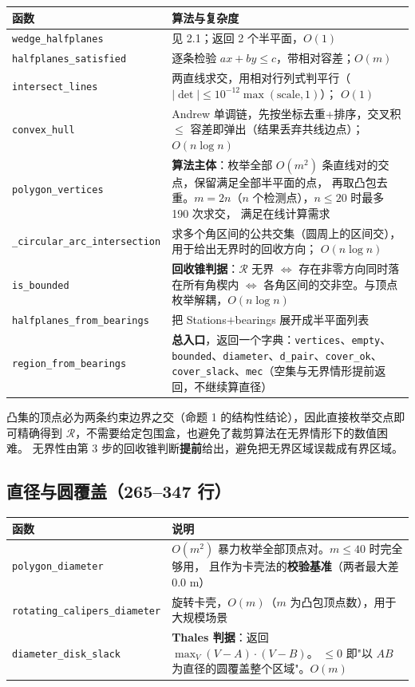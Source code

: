 \begin{longtable}{p{5.0cm}p{9.6cm}}
\toprule
函数 & 算法与复杂度 \\ \midrule
\endhead
\texttt{wedge\_halfplanes} & 见 2.1；返回 2 个半平面，$O(1)$ \\
\texttt{halfplanes\_satisfied} & 逐条检验 $ax+by\le c$，带相对容差；$O(m)$ \\
\texttt{intersect\_lines} & 两直线求交，用相对行列式判平行（$|\det|\le10^{-12}\max(\text{scale},1)$）；
$O(1)$ \\
\texttt{convex\_hull} & Andrew 单调链，先按坐标去重+排序，交叉积 $\le$ 容差即弹出（结果丢弃共线边点）；
$O(n\log n)$ \\
\texttt{polygon\_vertices} & \textbf{算法主体}：枚举全部 $O(m^2)$ 条直线对的交点，保留满足全部半平面的点，
再取凸包去重。$m=2n$（$n$ 个检测点），$n\le20$ 时最多 190 次求交，
满足在线计算需求 \\
\texttt{\_circular\_\hspace{0pt}arc\_intersection} & 求多个角区间的公共交集（圆周上的区间交），用于给出无界时的回收方向；
$O(n\log n)$ \\
\texttt{is\_bounded} & \textbf{回收锥判据}：$\mathcal R$ 无界 $\iff$ 存在非零方向同时落在所有角楔内
$\iff$ 各角区间的交非空。与顶点枚举解耦，$O(n\log n)$ \\
\texttt{halfplanes\_from\_bearings} & 把 Stations$+$bearings 展开成半平面列表 \\
\texttt{region\_from\_bearings} & \textbf{总入口}，返回一个字典：\texttt{vertices}、\texttt{empty}、
\texttt{bounded}、\texttt{diameter}、\texttt{d\_pair}、\texttt{cover\_ok}、
\texttt{cover\_slack}、\texttt{mec}（空集与无界情形提前返回，不继续算直径） \\
\bottomrule
\end{longtable}

\begin{keybox}[title=为什么"顶点枚举"而不是传统半平面裁剪]
凸集的顶点必为两条约束边界之交（命题 1 的结构性结论），因此直接枚举交点即可精确得到
$\mathcal R$，不需要给定包围盒，也避免了裁剪算法在无界情形下的数值困难。
无界性由第 3 步的回收锥判断\textbf{提前}给出，避免把无界区域误裁成有界区域。
\end{keybox}

\subsection{直径与圆覆盖（265--347 行）}

\begin{tabular}{p{4.6cm}p{9.2cm}}
\toprule
函数 & 说明 \\ \midrule
\texttt{polygon\_diameter} & $O(m^2)$ 暴力枚举全部顶点对。$m\le40$ 时完全够用，
且作为卡壳法的\textbf{校验基准}（两者最大差 0.0 m） \\
\texttt{rotating\_\hspace{0pt}calipers\_diameter} & 旋转卡壳，$O(m)$（$m$ 为凸包顶点数），用于大规模场景 \\
\texttt{diameter\_disk\_slack} & \textbf{Thales 判据}：返回 $\max_V (V-A)\cdot(V-B)$。
$\le0$ 即"以 $AB$ 为直径的圆覆盖整个区域"。$O(m)$ \\
\bottomrule
\end{tabular}

